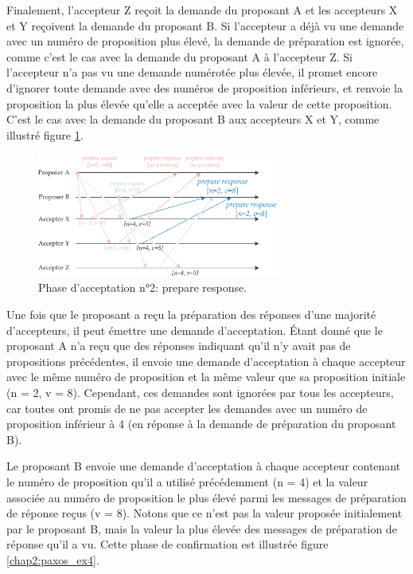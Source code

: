 Finalement, l'accepteur Z reçoit la demande du proposant A et les accepteurs X et Y reçoivent la demande du proposant B. Si l'accepteur a déjà vu une demande avec un numéro de proposition plus élevé, la demande de préparation est ignorée, comme c'est le cas avec la demande du proposant A à l'accepteur Z. Si l'accepteur n'a pas vu une demande numérotée plus élevée, il promet encore d'ignorer toute demande avec des numéros de proposition inférieurs, et renvoie la proposition la plus élevée qu'elle a acceptée avec la valeur de cette proposition. C'est le cas avec la demande du proposant B aux accepteurs X et Y, comme illustré figure \ref{chap2:paxos_ex3}.

\begin{figure}[H]
    \centering
    \includegraphics[width=8cm]{./images/paxos_ex3.png}
    \caption{Phase d'acceptation n°2: prepare response.}
    \label{chap2:paxos_ex3}
\end{figure}

Une fois que le proposant a reçu la préparation des réponses d'une majorité d'accepteurs, il peut émettre une demande d'acceptation. Étant donné que le proposant A n'a reçu que des réponses indiquant qu'il n'y avait pas de propositions précédentes, il envoie une demande d'acceptation à chaque accepteur avec le même numéro de proposition et la même valeur que sa proposition initiale (n = 2, v = 8). Cependant, ces demandes sont ignorées par tous les accepteurs, car toutes ont promis de ne pas accepter les demandes avec un numéro de proposition inférieur à 4 (en réponse à la demande de préparation du proposant B).

Le proposant B envoie une demande d'acceptation à chaque accepteur contenant le numéro de proposition qu'il a utilisé précédemment (n = 4) et la valeur associée au numéro de proposition le plus élevé parmi les messages de préparation de réponse reçus (v = 8). Notons que ce n'est pas la valeur proposée initialement par le proposant B, mais la valeur la plus élevée des messages de préparation de réponse qu'il a vu. Cette phase de confirmation est illustrée figure \ref{chap2:paxos_ex4}.

